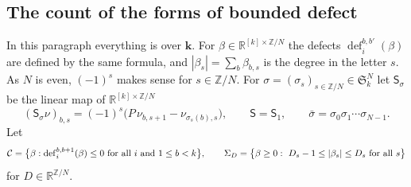 \documentclass[10pt]{amsart}
\theoremstyle{definition}
\theoremstyle{remark}
\newcommand{\R}{\mathbb R}
\newcommand{\Z}{\mathbb Z}
\providecommand{\phdef}{\operatorname{def}}
\providecommand{\phk}{\boldsymbol k}
\begin{document}
\subsection{The count of the forms of bounded defect}\label{pe:ss-count}
In this paragraph everything is over $\phk$. For $\beta\in\R^{[k]\times\Z/N}$ the defects
$\phdef^{b,b'}_i(\beta)$ are defined by the same formula, and $|\beta_s|=\sum_b\beta_{b,s}$ is the
degree in the letter $s$. As $N$ is even, $(-1)^s$ makes sense for $s\in\Z/N$. For
$\sigma=(\sigma_s)_{s\in\Z/N}\in\mathfrak S_k^N$ let $\mathsf S_\sigma$ be the linear map of
$\R^{[k]\times\Z/N}$
\[
(\mathsf S_\sigma\nu)_{b,s}=(-1)^s\bigl(P\,\nu_{b,s+1}-\nu_{\sigma_s(b),s}\bigr),\qquad\mathsf
S=\mathsf S_1,\qquad\bar\sigma=\sigma_0\sigma_1\cdots\sigma_{N-1}.
\]
Let
\[
\peC=\bigl\{\beta:\phdef_i^{b,b+1}(\beta)\le0\ \text{for all }i\text{ and }1\le b<k\bigr\},\qquad
\Sigma_D=\bigl\{\beta\ge0:\ D_s-1\le|\beta_s|\le D_s\ \text{for all }s\bigr\}
\]
for $D\in\R^{\Z/N}$.
\end{document}
